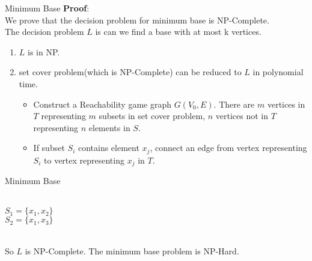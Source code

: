 \begin{frame}{Minimum Base}
    \textbf{Proof}:\\
    We prove that the decision problem for minimum base is NP-Complete.\\
    The decision problem $L$ is can we find a base with at most k vertices.\\
    \begin{enumerate}
        \item $L$ is in NP.
        \item set cover problem(which is NP-Complete) can be reduced to $L$ in polynomial time.
        \begin{itemize}
            \item Construct a Reachability game graph $G(V_0,E)$. There are $m$ vertices in $T$ representing $m$ subsets in set cover problem, $n$ vertices not in $T$ representing $n$ elements in $S$.
            \item If subset $S_i$ contains element $x_j$, connect an edge from vertex representing $S_i$ to vertex representing $x_j$ in $T$.
        \end{itemize}
    \end{enumerate}
\end{frame}
\begin{frame}{Minimum Base}
    \begin{adjustbox}{width=\textwidth}
    \end{adjustbox}\\
    
        $S_1=\{x_1,x_2\}$\\
        $S_2=\{x_1,x_3\}$\\~
    
    So $L$ is NP-Complete. The minimum base problem is NP-Hard.
\end{frame}

